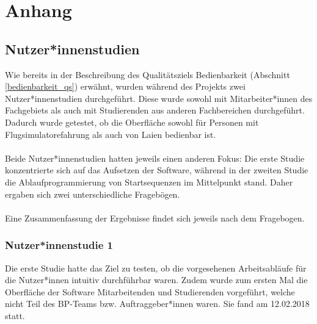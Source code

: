 \documentclass[accentcolor=tud9c,12pt,paper=a4]{tudreport}
\begin{document}
\appendix
	\chapter{Anhang}
	\section{Nutzer*innenstudien}
	Wie bereits in der Beschreibung des Qualitätsziels Bedienbarkeit (Abschnitt \ref{bedienbarkeit_qs})
	erwähnt, wurden während des Projekts zwei Nutzer*innenstudien durchgeführt. Diese wurde sowohl mit
	Mitarbeiter*innen des Fachgebiets als auch mit Studierenden aus anderen Fachbereichen durchgeführt.
	Dadurch wurde getestet, ob die Oberfläche sowohl für Personen mit Flugsimulatorefahrung als auch
	von Laien bedienbar ist.
	\\\\
	Beide Nutzer*innenstudien hatten jeweils einen anderen Fokus:
	Die erste Studie konzentrierte sich auf das Aufsetzen der Software, während in der zweiten Studie
	die Ablaufprogrammierung von Startsequenzen im Mittelpunkt stand. Daher ergaben sich zwei unterschiedliche
	Fragebögen.
	\\\\
	Eine Zusammenfassung der Ergebnisse findet sich jeweils nach dem Fragebogen.

	\subsection{Nutzer*innenstudie 1}
	Die erste Studie hatte das Ziel zu testen, ob die vorgesehenen Arbeitsabläufe für die Nutzer*innen
	intuitiv durchführbar waren. Zudem wurde zum ersten Mal die Oberfläche der Software Mitarbeitenden und Studierenden
	vorgeführt, welche nicht Teil des BP-Teams bzw. Auftraggeber*innen waren. Sie fand am 12.02.2018 statt.
	
	
\end{document}
